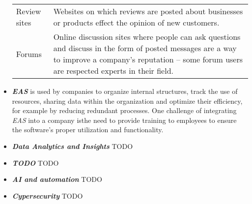 \documentclass[a4]{scrartcl}
\begin{document}
\begin{itemize}
\begin{tabular}{l|p{10.5cm}}
			Review sites & Websites on which reviews are posted about businesses or products effect the opinion of new customers.~\cite{socialmedia} \\
			
			Forums & Online discussion sites where people can ask questions and discuss in the form of posted messages are a way to improve a company's reputation -- some forum users are respected experts in their field.~\cite{socialmedia} \\
			
			
		\end{tabular}

		
		
		
		
		
		
		\item \textit{\textbf{EAS}} is used by companies to organize internal structures, track the use of resources, sharing data within the organization and optimize their efficiency, for example by reducing redundant processes. One challenge of integrating \textit{EAS} into a company isthe need to provide training to employees to ensure the software's proper utilization and functionality.~\cite{eas1, eas2}
		
		
		
		\item \textit{\textbf{Data Analytics and Insights}} TODO
		
		
		\item  \textit{\textbf{TODO}} TODO
		
		
		
		\item 	\textit{\textbf{AI and automation}} TODO
		
		
		
		
		\item 	\textit{\textbf{Cypersecurity}} TODO
		

\end{itemize}
\end{document}

